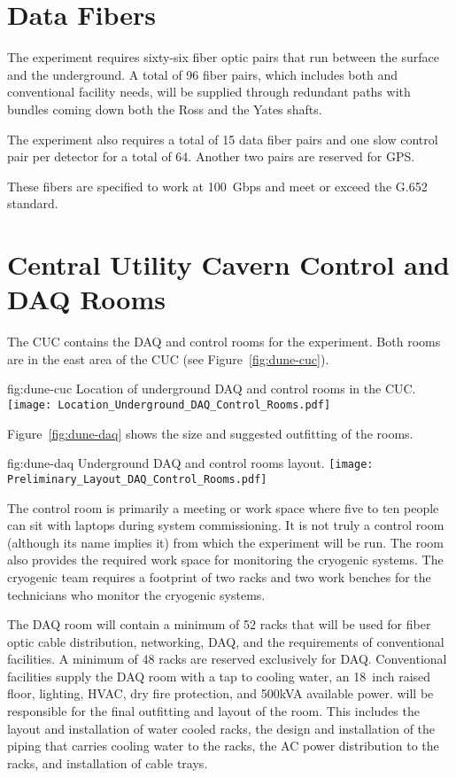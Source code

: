 \section{Data Fibers}
\label{sec:fdsp-coord-faci-fibers}


The  experiment requires sixty-six fiber
optic pairs that run between the surface and the underground.  A
total of 96 fiber pairs, which includes both  and conventional
facility needs, will be supplied through redundant paths with bundles
coming down both the Ross and the Yates shafts.


The experiment also requires a total of 15 data fiber pairs and
one slow control pair per detector for a total of 64.  Another
two pairs are reserved for GPS.


These fibers are specified to work at 100~Gbps and meet or exceed the
G.652 standard.


\section{Central Utility Cavern Control and DAQ Rooms}
\label{sec:fdsp-coord-cuc-daq}


The CUC contains the DAQ and control
rooms for the  experiment.  Both rooms are in the east
area of the CUC (see Figure~\ref{fig:dune-cuc}).  
\begin{dunefigure}{fig:dune-cuc}
  {Location of underground DAQ and control rooms in the CUC.}
  \texttt{[image: Location\_Underground\_DAQ\_Control\_Rooms.pdf]}
\end{dunefigure}
Figure~\ref{fig:dune-daq} shows the size and suggested outfitting of the rooms.
\begin{dunefigure}{fig:dune-daq}
  {Underground DAQ and control rooms layout.}
  \texttt{[image: Preliminary\_Layout\_DAQ\_Control\_Rooms.pdf]}
\end{dunefigure}


The control room is primarily a meeting or work space where
five to ten people can sit with laptops during system commissioning.
It is not truly a control room (although its name implies it) from which the
experiment will be run.  The room also provides the required work space for
monitoring the cryogenic systems.  The cryogenic team requires a
footprint of two racks and two work benches for the technicians who monitor the cryogenic systems.
       
The DAQ room will contain a minimum of 52 racks that will be used for
fiber optic cable distribution, networking,  DAQ, and the
requirements of conventional facilities.  A minimum of 48 racks are
reserved exclusively for DAQ.  Conventional facilities supply the DAQ
room with a tap to cooling water, an 18~inch raised floor, lighting,
HVAC, dry fire protection, and 500kVA available power.   will be responsible for the final outfitting and layout
of the room.  This includes the layout and installation of water
cooled racks, the design and installation of the piping that carries cooling water 
to the racks, the AC power distribution to the racks, and installation
of cable trays.


